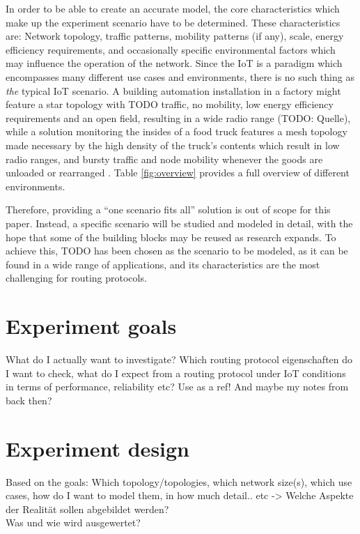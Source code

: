 \documentclass{acm_proc_article-sp}
\begin{document}
In order to be able to create an accurate model, the core characteristics which make up the experiment scenario have to be determined. These characteristics are: Network topology, traffic patterns, mobility patterns (if any), scale, energy efficiency requirements, and occasionally specific environmental factors which may influence the operation of the network.
Since the IoT is a paradigm which encompasses many different use cases and environments, there is no such thing as \emph{the} typical IoT scenario. A building automation installation in a factory might feature a star topology with TODO traffic, no mobility, low energy efficiency requirements and an open field, resulting in a wide radio range (TODO: Quelle), while a solution monitoring the insides of a food truck features a mesh topology made necessary by the high density of the truck's contents which result in low radio ranges, and bursty traffic and node mobility whenever the goods are unloaded or rearranged \cite{food_monitoring}.
Table \ref{fig:overview} provides a full overview of different environments.

Therefore, providing a ``one scenario fits all'' solution is out of scope for this paper. Instead, a specific scenario will be studied and modeled in detail, with the hope that some of the building blocks may be reused as research expands.
To achieve this, TODO has been chosen as the scenario to be modeled, as it can be found in a wide range of applications, and its characteristics are the most challenging for routing protocols.

\section{Experiment goals}
\label{sec:Goals}
What do I actually want to investigate? Which routing protocol eigenschaften do I want to check, what do I expect from a routing protocol under IoT conditions in terms of performance, reliability etc?
Use \cite{RFC-2501} as a ref! And maybe my notes from back then?

\section{Experiment design}
\label{sec:Design}
Based on the goals: Which topology/topologies, which network size(s), which use cases, how do I want to model them, in how much detail.. etc -> Welche Aspekte der Realität sollen abgebildet werden?\\
Was und wie wird ausgewertet?
\end{document}
